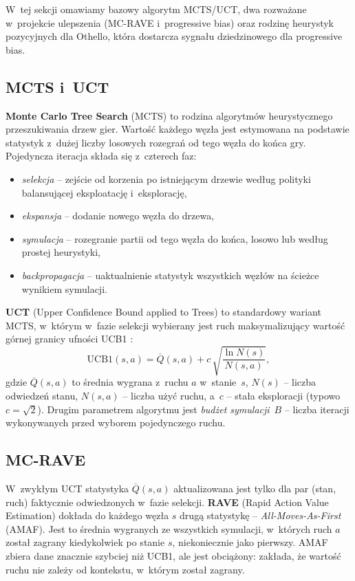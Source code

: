 \documentclass[11pt,a4paper]{article}
\begin{document}
W~tej sekcji omawiamy bazowy algorytm MCTS/UCT, dwa rozważane w~projekcie ulepszenia (MC-RAVE i~progressive bias) oraz rodzinę heurystyk pozycyjnych dla Othello, która dostarcza sygnału dziedzinowego dla progressive bias.

\subsection{MCTS i~UCT}

\textbf{Monte Carlo Tree Search} (MCTS) \cite{coulom2007efficient,browne2012survey} to rodzina algorytmów heurystycznego przeszukiwania drzew gier. Wartość każdego węzła jest estymowana na podstawie statystyk z~dużej liczby losowych rozegrań od tego węzła do końca gry. Pojedyncza iteracja składa się z~czterech faz:
\begin{itemize}[leftmargin=1.5em,itemsep=2pt]
    \item \emph{selekcja} -- zejście od korzenia po istniejącym drzewie według polityki balansującej eksploatację i~eksplorację,
    \item \emph{ekspansja} -- dodanie nowego węzła do drzewa,
    \item \emph{symulacja} -- rozegranie partii od tego węzła do końca, losowo lub według prostej heurystyki,
    \item \emph{backpropagacja} -- uaktualnienie statystyk wszystkich węzłów na ścieżce wynikiem symulacji.
\end{itemize}

\textbf{UCT} (Upper Confidence Bound applied to Trees) \cite{kocsis2006bandit} to standardowy wariant MCTS, w~którym w~fazie selekcji wybierany jest ruch maksymalizujący wartość górnej granicy ufności UCB1 \cite{auer2002finite}:
\[
\mathrm{UCB1}(s, a) = \overline{Q}(s, a) + c\,\sqrt{\frac{\ln N(s)}{N(s, a)}},
\]
gdzie $\overline{Q}(s,a)$ to średnia wygrana z~ruchu $a$ w~stanie~$s$, $N(s)$ -- liczba odwiedzeń stanu, $N(s,a)$ -- liczba użyć ruchu, a~$c$ -- stała eksploracji (typowo $c = \sqrt{2}$). Drugim parametrem algorytmu jest \emph{budżet symulacji}~$B$ -- liczba iteracji wykonywanych przed wyborem pojedynczego ruchu.

\subsection{MC-RAVE}

W~zwykłym UCT statystyka $\overline{Q}(s, a)$ aktualizowana jest tylko dla par (stan, ruch) faktycznie odwiedzonych w~fazie selekcji. \textbf{RAVE} (Rapid Action Value Estimation) \cite{gelly2011mcts} dokłada do każdego węzła $s$ drugą statystykę -- \emph{All-Moves-As-First} (AMAF). Jest to średnia wygranych ze wszystkich symulacji, w~których ruch $a$ został zagrany kiedykolwiek po stanie $s$, niekoniecznie jako pierwszy. AMAF zbiera dane znacznie szybciej niż UCB1, ale jest obciążony: zakłada, że wartość ruchu nie zależy od kontekstu, w~którym został zagrany.
\end{document}
